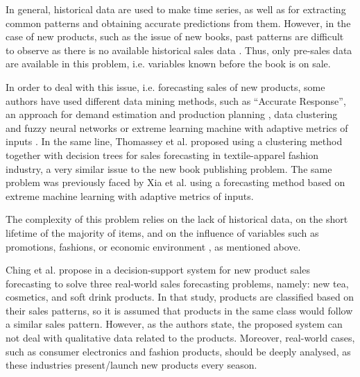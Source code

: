 \documentclass[a4paper,10pt,twocolumn,preprint,3p]{elsarticle}
\begin{document}
%
%
%

In general, historical data are used to make time series, as well as for extracting common patterns and obtaining accurate predictions from them.
However, in the case of new products, such as the issue of new books, past patterns are difficult to observe as there is no available historical sales data 
\cite{ChingChin2010}. Thus, only pre-sales data are available in this problem, i.e. variables known before the book is on sale.

In order to deal with this issue, i.e. forecasting sales of new products, some authors have used different data mining methods, such as 
``Accurate Response'', an approach for demand estimation and production planning \cite{Hammond1990}, 
data clustering and fuzzy neural networks \cite{Chang2009} or 
extreme learning machine with adaptive metrics of inputs \cite{Xia2012}. 
%
In the same line, Thomassey et al. \cite{SThomassey2014} proposed using a 
clustering method together with decision trees for sales forecasting in 
textile-apparel fashion industry, a very similar issue to the new book 
publishing problem.
The same problem was previously faced by Xia et al. \cite{Xia2012} using a 
forecasting method based on extreme machine learning with adaptive metrics of inputs.

The complexity of this problem relies on the lack of historical data, on the 
short lifetime of the majority of items, and on the influence of variables such 
as promotions, fashions, or economic environment
 \cite{Thomassey2012,Xia2012,SThomassey2014}, as mentioned above.

Ching et al. propose in \cite{ChingChin2010} a decision-support system for new 
product sales forecasting to solve three real-world sales forecasting 
problems, namely: new tea, cosmetics, and soft drink products. 
In that study, products are classified based on their sales patterns, so it is 
assumed that products in the same class would follow a similar sales pattern. 
However, as the authors state, the proposed system can not deal with qualitative 
data related to the products. Moreover, real-world cases, such as consumer 
electronics and fashion products, should be deeply analysed, as these industries 
present/launch new products every season. 
\end{document}
